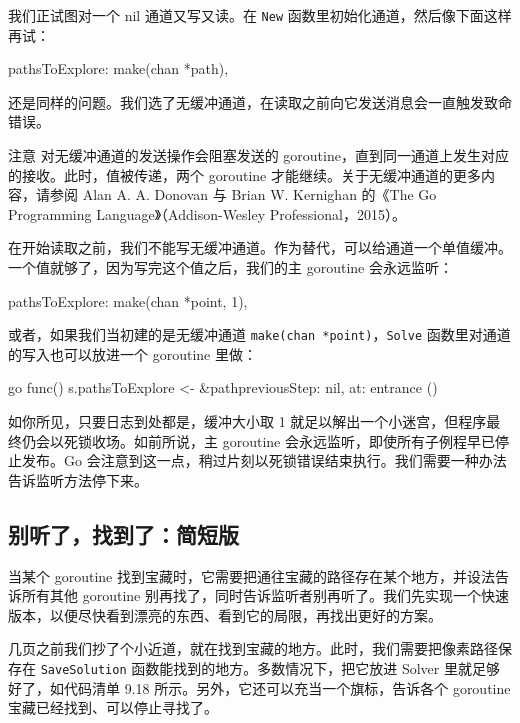 我们正试图对一个 nil 通道又写又读。在 \texttt{New} 函数里初始化通道，然后像下面这样再试：

\begin{gocode}[]
pathsToExplore: make(chan *path),
\end{gocode}

还是同样的问题。我们选了无缓冲通道，在读取之前向它发送消息会一直触发致命错误。

\begin{infobox}{注意}
对无缓冲通道的发送操作会阻塞发送的 goroutine，直到同一通道上发生对应的接收。此时，值被传递，两个 goroutine 才能继续。关于无缓冲通道的更多内容，请参阅 Alan A. A. Donovan 与 Brian W. Kernighan 的《The Go Programming Language》（Addison-Wesley Professional，2015）。
\end{infobox}

在开始读取之前，我们不能写无缓冲通道。作为替代，可以给通道一个单值缓冲。一个值就够了，因为写完这个值之后，我们的主 goroutine 会永远监听：

\begin{gocode}[]
pathsToExplore: make(chan *point, 1),
\end{gocode}

或者，如果我们当初建的是无缓冲通道 \texttt{make(chan *point)}，\texttt{Solve} 函数里对通道的写入也可以放进一个 goroutine 里做：

\begin{gocode}[]
go func() { s.pathsToExplore <- &path{previousStep: nil, at: entrance} }()
\end{gocode}

如你所见，只要日志到处都是，缓冲大小取 1 就足以解出一个小迷宫，但程序最终仍会以死锁收场。如前所说，主 goroutine 会永远监听，即使所有子例程早已停止发布。Go 会注意到这一点，稍过片刻以死锁错误结束执行。我们需要一种办法告诉监听方法停下来。

\subsection{别听了，找到了：简短版}

当某个 goroutine 找到宝藏时，它需要把通往宝藏的路径存在某个地方，并设法告诉所有其他 goroutine 别再找了，同时告诉监听者别再听了。我们先实现一个快速版本，以便尽快看到漂亮的东西、看到它的局限，再找出更好的方案。

几页之前我们抄了个小近道，就在找到宝藏的地方。此时，我们需要把像素路径保存在 \texttt{SaveSolution} 函数能找到的地方。多数情况下，把它放进 Solver 里就足够好了，如代码清单 9.18 所示。另外，它还可以充当一个旗标，告诉各个 goroutine 宝藏已经找到、可以停止寻找了。

